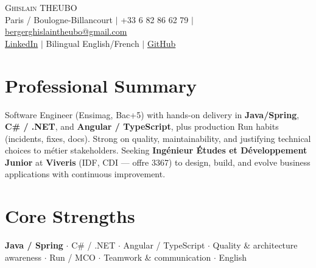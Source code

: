 \documentclass[letterpaper,10.5pt]{article}
\begin{document}
\begin{center}
{\Huge \scshape Ghislain THEUBO} \\ \vspace{2pt}
\small Paris / Boulogne-Billancourt $|$ +33 6 82 86 62 79 $|$ \href{mailto:bergerghislaintheubo@gmail.com}{bergerghislaintheubo@gmail.com} \\
\href{https://www.linkedin.com/in/berger-ghislain}{LinkedIn} $|$ Bilingual English/French $|$ \href{https://github.com/Bergerghislain}{GitHub}
\end{center}
\vspace{-6pt}
\section{Professional Summary}
\small{Software Engineer (Ensimag, Bac+5) with hands-on delivery in \textbf{Java/Spring}, \textbf{C\# / .NET}, and \textbf{Angular / TypeScript}, plus production Run habits (incidents, fixes, docs). Strong on quality, maintainability, and justifying technical choices to m\'etier stakeholders. Seeking \textbf{Ing\'enieur \'Etudes et D\'eveloppement Junior} at \textbf{Viveris} (IDF, CDI --- offre 3367) to design, build, and evolve business applications with continuous improvement.}
\section{Core Strengths}
\small{\textbf{Java / Spring} $\cdot$ C\# / .NET $\cdot$ Angular / TypeScript $\cdot$ Quality \& architecture awareness $\cdot$ Run / MCO $\cdot$ Teamwork \& communication $\cdot$ English}
\end{document}
